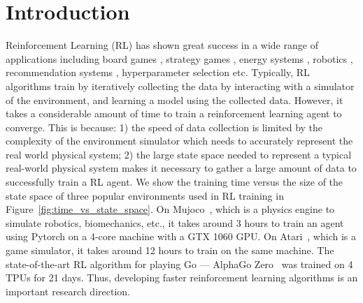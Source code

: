 \section{Introduction}
Reinforcement Learning (RL) has shown great success in a wide range of applications including board games \cite{alphago}, strategy games \cite{alphastarblog}, energy systems \cite{chi_buildsys19}, robotics \cite{rl_robots_nn}, recommendation systems \cite{recommendation_rl}, hyperparameter selection \cite{effective_online_hyperparameter} etc. Typically, RL algorithms train by iteratively collecting the data by interacting with a simulator of the environment, and learning a model using the collected data. However, it takes a considerable amount of time to train a reinforcement learning agent to converge. This is because: 1) the speed of data collection is limited by the complexity of the environment simulator which needs to accurately represent the real world physical system; 2) the large state space needed to represent a typical real-world physical system makes it necessary to gather a large amount of data to successfully train a RL agent.  We show the training time versus the size of the state space of three popular environments used in RL training in Figure~\ref{fig:time_vs_state_space}. On Mujoco~\cite{mujoco}, which is a physics engine to simulate robotics, biomechanics, etc., it takes around 3 hours to train an agent using Pytorch \cite{pytorch} on a 4-core machine with a GTX 1060 GPU. On Atari~\cite{openai_gym}, which is a game simulator, it takes around 12 hours to train on the same machine. The state-of-the-art RL algorithm for playing Go --- AlphaGo Zero~\cite{alphago_zero} was trained on 4 TPUs \cite{tpu} for 21 days. Thus, developing faster reinforcement learning algorithms is an important research direction.




 

